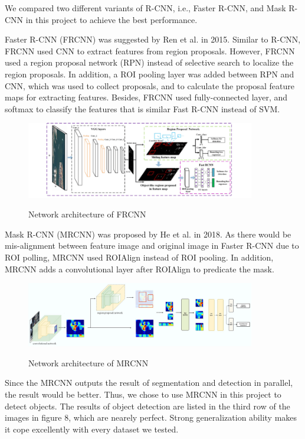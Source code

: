 \documentclass[runningheads]{llncs}
\begin{document}
We compared two different variants of R-CNN, i.e., Faster 
R-CNN, and Mask R-CNN in this project to achieve the best 
performance. 

Faster R-CNN\cite{FasterRCNN} (FRCNN) was suggested by Ren 
et al. in 2015. Similar to R-CNN, FRCNN used CNN to extract 
features from region proposals. However, FRCNN used a 
region proposal network (RPN) instead of selective search 
to localize the region proposals. In addition, a ROI 
pooling layer was added between RPN and CNN, which was used 
to collect proposals, and to calculate the proposal feature 
maps for extracting features. Besides, FRCNN used 
fully-connected layer, and softmax to classify the features 
that is similar Fast R-CNN instead of SVM. 

\begin{figure}
    \centering
    \includegraphics[width=10cm]{reference/frcnn}
    \label{fig:FRCNN}
    \caption{Network architecture of FRCNN\cite{FasterRCNN}}
\end{figure}

Mask R-CNN\cite{MaskRCNN} (MRCNN) was proposed by He et al. 
in 2018. As there would be mis-alignment between feature 
image and original image in Faster R-CNN due to ROI polling, 
MRCNN used ROIAlign instead of ROI pooling. In addition, 
MRCNN adds a convolutional layer after ROIAlign to predicate 
the mask. 

\begin{figure}
    \centering
    \includegraphics[width=10cm]{reference/mrcnn}
    \label{fig:MRCNN}
    \caption{Network architecture of MRCNN\cite{MaskRCNN}}
\end{figure}

Since the MRCNN outputs the result of segmentation and 
detection in parallel, the result would be better. Thus, 
we chose to use MRCNN in this project to detect objects.
The results of object detection are listed in the third row 
of the images in figure 8, which are nearely perfect. 
Strong generalization ability makes it cope excellently 
with every dataset we tested. 
\end{document}
